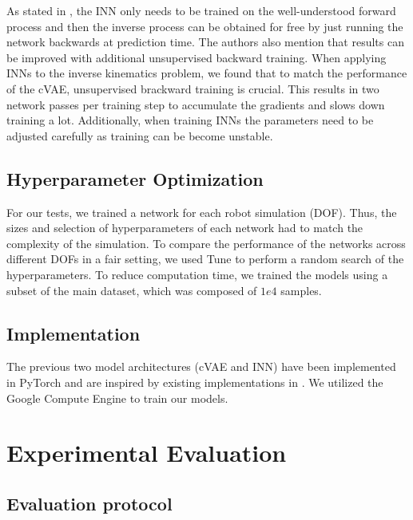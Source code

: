 \documentclass[conference]{IEEEtran}
\begin{document}
As stated in \cite{Ardizzone2018}, the INN only needs to be trained on the well-understood forward process and then the inverse process can be obtained for free by just running the network backwards at prediction time. The authors also mention that results can be improved with additional unsupervised backward training. When applying INNs to the inverse kinematics problem, we found that to match the performance of the cVAE, unsupervised brackward training is crucial. This results in two network passes per training step to accumulate the gradients and slows down training a lot. Additionally, when training INNs the parameters need to be adjusted carefully as training can be become unstable.

\subsection*{Hyperparameter Optimization}

For our tests, we trained a network for each robot simulation (DOF). Thus, the sizes and selection of hyperparameters of each network had to match the complexity of the simulation. To compare the performance of the networks across different DOFs in a fair setting, we used Tune \cite{liaw2018tune} to perform a random search of the hyperparameters. To reduce computation time, we trained the models using a subset of the main dataset, which was composed of \( 1e4 \) samples.


\subsection*{Implementation}

The previous two model architectures (cVAE and INN) have been implemented in PyTorch and are inspired by existing implementations in  \cite{graviraja2019, freia2020}. We utilized the Google Compute Engine to train our models.

\section*{Experimental Evaluation}

\subsection*{Evaluation protocol}
\end{document}
